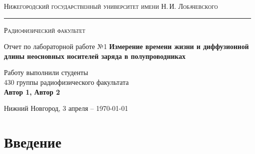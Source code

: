 \documentclass[a4paper,12pt]{article}
\def\labauthor{Автор 1, Автор 2}
\def\labnumber{1}
\def\labtheme{Измерение времени жизни и диффузионной длины неосновных 
носителей заряда в полупроводниках}
\begin{document}
\begin{titlepage}
\begin{center}

{\textsc{Нижегородский государственный университет имени Н.\,И. Лобачевского}}
\vskip 2pt \hrule \vskip 3pt
{\textsc{Радиофизический факультет}}

\vfill


{{\LARGE Отчет по лабораторной работе №\labnumber}\vskip 12pt {\Huge \bfseries \labtheme}}

	
\vspace{2cm}
{\large Работу выполнили студенты \\[-0.25em] 430 группы радиофизического факультата \\[0.5em] {\Large \bfseries \labauthor}}



\end{center}

\vfill
	
	
	
\begin{center}
	{Нижний Новгород, 3 апреля -- \today}
\end{center}

\end{titlepage}
\tableofcontents
\newpage

\section*{Введение}
\end{document}
